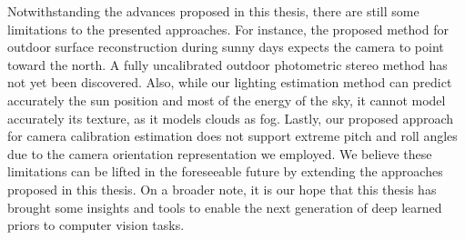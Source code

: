 Notwithstanding the advances proposed in this thesis, there are still some limitations to the presented approaches. For instance, the proposed method for outdoor surface reconstruction during sunny days expects the camera to point toward the north. A fully uncalibrated outdoor photometric stereo method has not yet been discovered. Also, while our lighting estimation method can predict accurately the sun position and most of the energy of the sky, it cannot model accurately its texture, as it models clouds as fog. Lastly, our proposed approach for camera calibration estimation does not support extreme pitch and roll angles due to the camera orientation representation we employed. We believe these limitations can be lifted in the foreseeable future by extending the approaches proposed in this thesis. On a broader note, it is our hope that this thesis has brought some insights and tools to enable the next generation of deep learned priors to computer vision tasks. 
